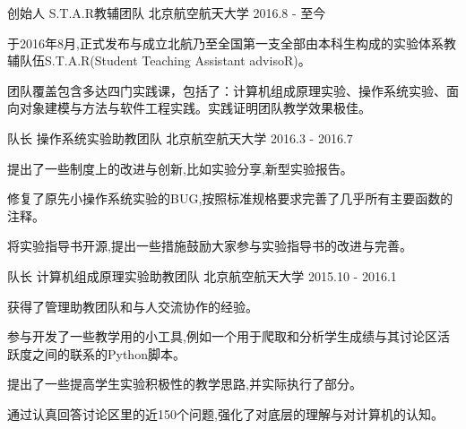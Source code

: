 


\begin{cventries}


\cventry
{创始人} %
{S.T.A.R教辅团队} %
{北京航空航天大学} %
{2016.8 - 至今} %
{ %
	\begin{cvitems}
		\item {于2016年8月,正式发布与成立北航乃至全国第一支全部由本科生构成的实验体系教辅队伍S.T.A.R(Student Teaching Assistant advisoR)。}
		\item {团队覆盖包含多达四门实践课，包括了：计算机组成原理实验、操作系统实验、面向对象建模与方法与软件工程实践。实践证明团队教学效果极佳。}
	\end{cvitems}
}

\cventry
{队长} %
{操作系统实验助教团队} %
{北京航空航天大学} %
{2016.3 - 2016.7} %
{ %
	\begin{cvitems}
		\item {提出了一些制度上的改进与创新,比如实验分享,新型实验报告。}
		\item {修复了原先小操作系统实验的BUG,按照标准规格要求完善了几乎所有主要函数的注释。}
		\item {将实验指导书开源,提出一些措施鼓励大家参与实验指导书的改进与完善。}
	\end{cvitems}
}



\cventry
{队长} %
{计算机组成原理实验助教团队} %
{北京航空航天大学} %
{2015.10 - 2016.1} %
{ %
\begin{cvitems}
\item {获得了管理助教团队和与人交流协作的经验。}
\item {参与开发了一些教学用的小工具,例如一个用于爬取和分析学生成绩与其讨论区活跃度之间的联系的Python脚本。}
\item {提出了一些提高学生实验积极性的教学思路,并实际执行了部分。}
\item {通过认真回答讨论区里的近150个问题,强化了对底层的理解与对计算机的认知。}
\end{cvitems}
}


\end{cventries}

